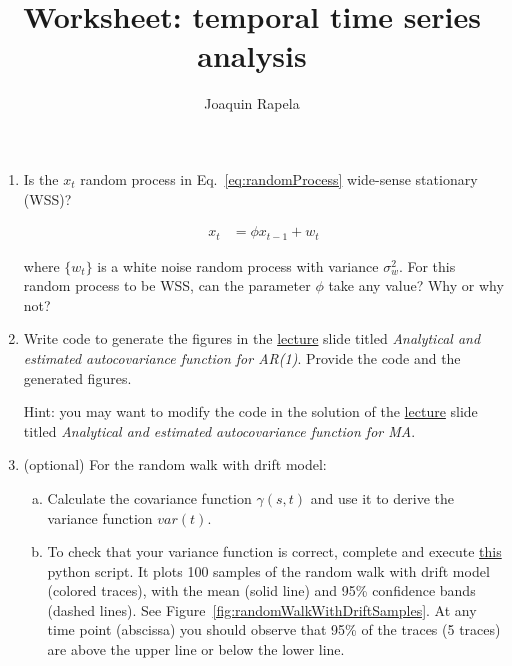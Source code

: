 \documentclass[12pt]{article}
\title{Worksheet: temporal time series analysis}
\author{Joaquin Rapela}
\begin{document}
\maketitle

\begin{enumerate}

    \item Is the $x_t$ random process in Eq.~\ref{eq:randomProcess} wide-sense
        stationary (WSS)?

        \begin{align}
            x_t & = \phi x_{t-1} + w_t\label{eq:randomProcess}
        \end{align}

        where $\{w_t\}$ is a white noise random process with variance
        $\sigma^2_w$. For this random process to be WSS, can the parameter
        $\phi$ take any value? Why or why not?

    \item Write code to generate the figures in the
        \href{https://github.com/joacorapela/statNeuro2025/blob/master/lectures/01_temporalTimeSeriesAnalysis/temporalTimeSeriesAnalysis.pdf}{lecture}
        slide titled \emph{Analytical and estimated autocovariance function for
        AR(1)}. Provide the code and the generated figures.

        Hint: you may want to modify the code in the solution of the
        \href{https://github.com/joacorapela/statNeuro2025/blob/master/lectures/01_temporalTimeSeriesAnalysis/temporalTimeSeriesAnalysis.pdf}{lecture}
        slide titled \emph{Analytical and estimated autocovariance function for MA}.

    \item (optional) For the random walk with drift model:

        \begin{enumerate}[(a)]

            \item Calculate the covariance function $\gamma(s, t)$ and use it
                to derive the variance function $var(t)$.

            \item To check that your variance function is correct, complete and
                execute \href{}{this} python script. It plots 100 samples of
                the random walk with drift model (colored traces), with the
                mean (solid line) and 95\%
                confidence bands (dashed lines). See
                Figure~\ref{fig:randomWalkWithDriftSamples}. At any time point
                (abscissa) you should observe that 95\% of the traces (5
                traces) are above the upper line or below the lower line.



\end{enumerate}
\end{enumerate}
\end{document}
